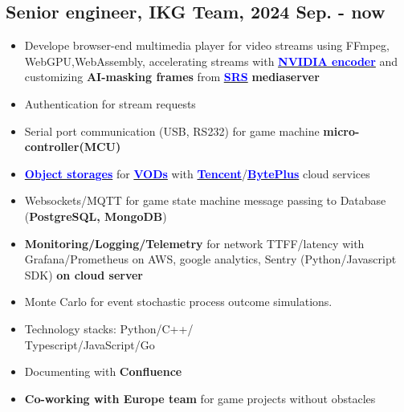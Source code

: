\documentclass[11pt]{article}
\begin{document}
\begin{multicols*}{2}
\begin{experiencebox}
\subsection*{Senior engineer, IKG Team, 2024 Sep. - now}
\begin{itemize}[noitemsep]
    \item Develope browser-end multimedia player for video streams using FFmpeg, WebGPU,WebAssembly, 
    accelerating streams with \href{https://developer.nvidia.com/video-codec-sdk}{\textbf{\textcolor{blue}{NVIDIA encoder}}} 
    and customizing\textbf{ AI-masking frames} from \href{https://github.com/ossrs/srs}{\textbf{\textcolor{blue}{SRS}}} \textbf{ mediaserver} 
    \item Authentication for stream requests
    \item Serial port communication (USB, RS232) for game machine \textbf{micro-controller(MCU)}
    \item \href{https://www.byteplus.com/en/product/tos}{\textbf{\textcolor{blue}{Object storages}}} for \href{https://www.overleaf.com/read/xzdtxtgxtnby#49163b}{\textbf{\textcolor{blue}{VODs}}} with \href{https://www.tencent.com/en-us/cloud}{\textbf{\textcolor{blue}{Tencent}}}/\href{https://www.byteplus.com/en/product/vod}{\textbf{\textcolor{blue}{BytePlus}}} cloud services
    \item Websockets/MQTT for game state machine message passing to Database (\textbf{PostgreSQL, MongoDB})
    \item \textbf{Monitoring/Logging/Telemetry} for network TTFF/latency with Grafana/Prometheus on AWS, 
    google analytics, Sentry (Python/Javascript SDK) \textbf{on cloud server}
    \item Monte Carlo for event stochastic process outcome simulations.
    \item Technology stacks: Python/C++/\\Typescript/JavaScript/Go 
    \item Documenting with \textbf{Confluence}
    \item \textbf{Co-working with Europe team} for game projects without obstacles
\end{itemize}

\vspace{0.3em}


\end{experiencebox}
\end{multicols*}
\end{document}
